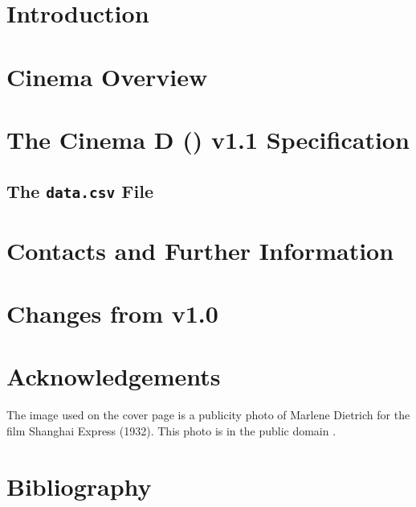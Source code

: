 \documentclass{article}
\begin{document}
\renewcommand\Authands{ and } 
 
\setcounter{secnumdepth}{5} 
\setcounter{tocdepth}{5} 
\newcommand{\subsubsubsection}[1]{\paragraph{#1}} 




\section{Introduction}
\label{intro}


\section{Cinema Overview}
\label{overview}


\newpage
\section{The Cinema D (\dietrich) v1.1 Specification}
\label{dietrich}


\subsection{The \texttt{data.csv} File}
\label{csv}


\section{Contacts and Further Information}
\label{contacts}


\section{Changes from v1.0}
\label{changes}


\section{Acknowledgements}
The image used on the cover page is a publicity photo of Marlene Dietrich for the film Shanghai Express (1932). This  photo is in the public domain \cite{dietrich}.

\newpage
\section{Bibliography}


\end{document}
